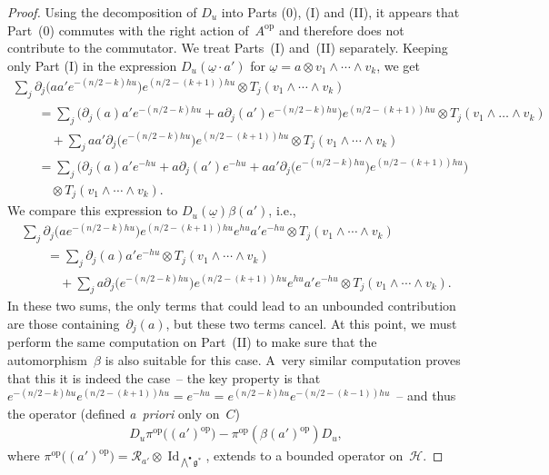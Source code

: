 \documentclass[pdftex]{sigma}
\newcommand{\Core}{C}
\newcommand{\Hh}{\mathscr{H}}
\newcommand{\LieG}{\mathfrak{g}}
\newcommand{\omegat}{\underline{\omega}}
\newcommand{\RightMult}{\mathcal{R}}
\DeclareMathOperator{\id}{Id}
\numberwithin{equation}{section}
\begin{document}
\begin{proof}
Using the decomposition of $D_u$ into Parts (0), (I) and (II), it appears that Part~(0) commutes with the right action of~$A^\text{op}$ and therefore does not contribute to the commutator. We treat Parts~(I) and~(II) separately. Keeping only Part (I) in the expression $D_u( \omegat \cdot a')$ for $\omegat = a \otimes v_1 \wedge \cdots \wedge v_k$, we get
\begin{gather*}
\sum_j \partial_j\big(a a' e^{-(n/2 - k)h u} \big) e^{(n/2 - (k+1))h u} \otimes T_j( v_1 \wedge \cdots \wedge v_k) \\
\qquad{}
= \sum_j \big(\partial_j( a) a' e^{-(n/2 - k)h u} + a \partial_j(a') e^{-(n/2 - k)h u}\big) e^{(n/2 - (k+1))h u}
 \otimes T_j( v_1 \wedge \ldots \wedge v_k) \\
 \qquad\quad{}
+ \sum_{j} a a' \partial _j\big(e^{-(n/2 - k)h u}\big) e^{(n/2 - (k+1))h u} \otimes T_j(v_1 \wedge \cdots \wedge v_k)\\
\qquad{}
= \sum_{j} \big(\partial _j(a) a' e^{- h u} + a \partial _j(a') e^{-hu} + a a' \partial _j\big(e^{-(n/2 - k)h u}\big) e^{(n/2 - (k+1))h u} \big)\\
\qquad\quad{}
 \otimes T_j(v_1 \wedge \cdots \wedge v_k).
\end{gather*}
We compare this expression to $D_u(\omegat) \beta(a')$, i.e.,
\begin{gather*}
\sum_j \partial_j\big(a e^{-(n/2 - k)h u} \big) e^{(n/2 - (k+1))h u} e^{h u} a' e^{-hu} \otimes T_j( v_1 \wedge \cdots \wedge v_k) \\
\qquad{}= \sum_j \partial_j(a) a' e^{-h u} \otimes T_j( v_1 \wedge \cdots \wedge v_k) \\
\qquad\quad{} + \sum_{j} a \partial _j\big(e^{-(n/2 - k)h u} \big) e^{(n/2 - (k+1))h u} e^{h u} a' e^{-hu} \otimes T_j( v_1 \wedge \cdots \wedge v_k).
\end{gather*}
In these two sums, the only terms that could lead to an unbounded contribution are those containing~$\partial _j(a)$, but these two terms cancel. At this point, we must perform the same computation on Part~(II) to make sure that the automorphism~$\beta$ is also suitable for this case. A~very similar computation proves that this it is indeed the case~-- the key property is that $e^{-(n/2 - k)h u} e^{(n/2 - (k+1))h u} = e^{- hu} = e^{(n/2 - k)h u} e^{-(n/2 - (k-1))h u}$~-- and thus the operator (def\/ined \textit{a~priori} only on~$\Core$)
\begin{gather*}
D_u \pi^\text{op}\big( (a')^\text{op} \big) - \pi^\text{op}( \beta(a')^\text{op}) D_u,
\end{gather*}
where $\pi^\text{op}\big( (a')^\text{op} \big) = \RightMult_{a'} \otimes \id_{\bigwedge^\bullet \LieG^*}$, extends to a bounded operator on~$\Hh$.
\end{proof}
\end{document}
